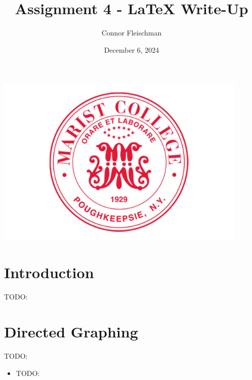 \documentclass[12pt, letterpaper]{article}
\title{Assignment 4 - LaTeX Write-Up}
\author{Connor Fleischman}
\date{December 6, 2024}
\begin{document}
\maketitle
\begin{center}
   \includegraphics[width=120mm,scale=0.5]{MaristSeal.png}
\end{center}
\newpage

\tableofcontents
\newpage
\setcounter{page}{1} %

\section{Introduction}
TODO:

\section{Directed Graphing} \label{Graph}
TODO:
\begin{itemize}
   \item TODO:
\end{itemize}
\end{document}
